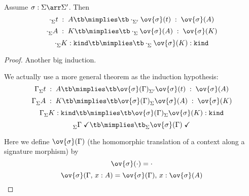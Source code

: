 \begin{lemma}\label{lem:lf:morapp}
Assume $\ismorph{\Sigma}{\Sigma'}{\sigma}$. Then
\[\ofdtype{\Sigma}{\cdot}{t}{A} \tb\mimplies\tb \ofdtype{\Sigma'}{\cdot}{\ov{\sigma}(t)}{\ov{\sigma}(A)}\]
\[\ofdkind{\Sigma}{\cdot}{A}{K} \tb\mimplies\tb \ofdkind{\Sigma}{\cdot}{\ov{\sigma}(A)}{\ov{\sigma}(K)}\]
\[\isdkind{\Sigma}{\cdot}{K} \tb\mimplies\tb \isdkind{\Sigma}{\cdot}{\ov{\sigma}(K)}\]
\end{lemma}
\begin{proof}
Another big induction.

We actually use a more general theorem as the induction hypothesis:
\[\ofdtype{\Sigma}{\Gamma}{t}{A} \tb\mimplies\tb
\ofdtype{\Sigma'}{\ov{\sigma}(\Gamma)}{\ov{\sigma}(t)}{\ov{\sigma}(A)}\]
\[\ofdkind{\Sigma}{\Gamma}{A}{K} \tb\mimplies\tb \ofdkind{\Sigma}{\ov{\sigma}(\Gamma)}{\ov{\sigma}(A)}{\ov{\sigma}(K)}\]
\[\isdkind{\Sigma}{\Gamma}{K} \tb\mimplies\tb
\isdkind{\Sigma}{\ov{\sigma}(\Gamma)}{\ov{\sigma}(K)}\]
\[\iscont{\Sigma}{\Gamma} \tb\mimplies\tb
\iscont{\Sigma}{\ov{\sigma}(\Gamma)}\]

Here we define $\ov{\sigma}(\Gamma)$ (the homomorphic translation of a context along a signature morphism) by
\[\ov{\sigma}(\cdot) = \cdot\]
\[\ov{\sigma}(\Gamma,\,x:A) = \ov{\sigma}(\Gamma),\,x:\ov{\sigma}(A)\]
\end{proof}
